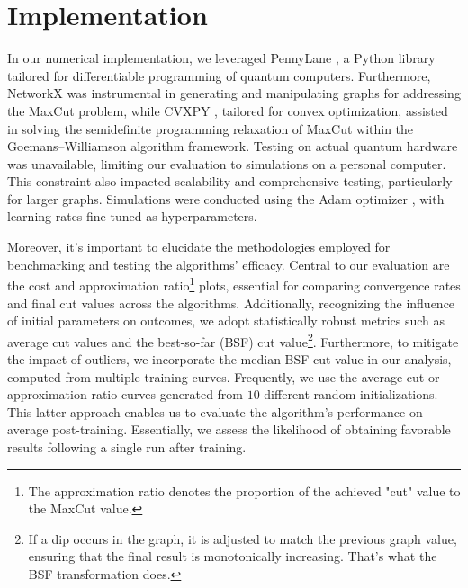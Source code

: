 \section{Implementation}
\label{sec:resul}

In our numerical implementation, we leveraged PennyLane \cite{Pennylane}, a Python library tailored for differentiable programming of quantum computers. Furthermore, NetworkX \cite{NetworkX} was instrumental in generating and manipulating graphs for addressing the MaxCut problem, while CVXPY \cite{cvxpy}, tailored for convex optimization, assisted in solving the semidefinite programming relaxation of MaxCut within the Goemans–Williamson algorithm framework. Testing on actual quantum hardware was unavailable, limiting our evaluation to simulations on a personal computer. This constraint also impacted scalability and comprehensive testing, particularly for larger graphs. Simulations were conducted using the Adam optimizer \cite{kingma2017adam}, with learning rates fine-tuned as hyperparameters.


Moreover, it's important to elucidate the methodologies employed for benchmarking and testing the algorithms' efficacy. Central to our evaluation are the cost and approximation ratio\footnote{The approximation ratio denotes the proportion of the achieved "cut" value to the MaxCut value.} plots, essential for comparing convergence rates and final cut values across the algorithms. Additionally, recognizing the influence of initial parameters on outcomes, we adopt statistically robust metrics such as average cut values and the best-so-far (BSF) cut value\footnote{If a dip occurs in the graph, it is adjusted to match the previous graph value, ensuring that the final result is monotonically increasing. That's what the BSF transformation does.}. Furthermore, to mitigate the impact of outliers, we incorporate the median BSF cut value in our analysis, computed from multiple training curves. Frequently, we use the average cut or approximation ratio curves generated from $10$ different random initializations. This latter approach enables us to evaluate the algorithm's performance on average post-training. Essentially, we assess the likelihood of obtaining favorable results following a single run after training.

